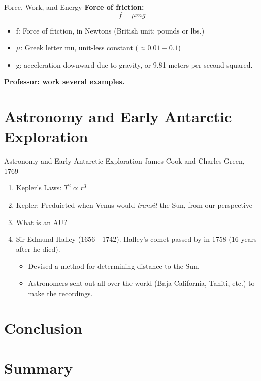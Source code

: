 \documentclass{beamer}
\begin{document}
\begin{frame}{Force, Work, and Energy}
\textbf{Force of friction:} 
\begin{equation}
f = \mu m g
\end{equation}
\begin{itemize}
\item f: Force of friction, in Newtons (British unit: pounds or lbs.)
\item $\mu$: Greek letter mu, unit-less constant ($\approx 0.01 - 0.1$)
\item g: acceleration downward due to gravity, or 9.81 meters per second squared.
\end{itemize}
\textbf{Professor: work several examples.}
\end{frame}

\section{Astronomy and Early Antarctic Exploration}

\begin{frame}{Astronomy and Early Antarctic Exploration}
James Cook and Charles Green, 1769
\begin{enumerate}
\item Kepler's Laws: $T^2 \propto r^3$
\item Kepler: Preduicted when Venus would \textit{transit} the Sun, from our perspective
\item What is an AU?
\item Sir Edmund Halley (1656 - 1742).  Halley's comet passed by in 1758 (16 years after he died).
\begin{itemize}
\item Devised a method for determining distance to the Sun.
\item Astronomers sent out all over the world (Baja California, Tahiti, etc.) to make the recordings.
\end{itemize}
\end{enumerate}
\end{frame}

\section{Conclusion}

\section{Summary}
\end{document}
